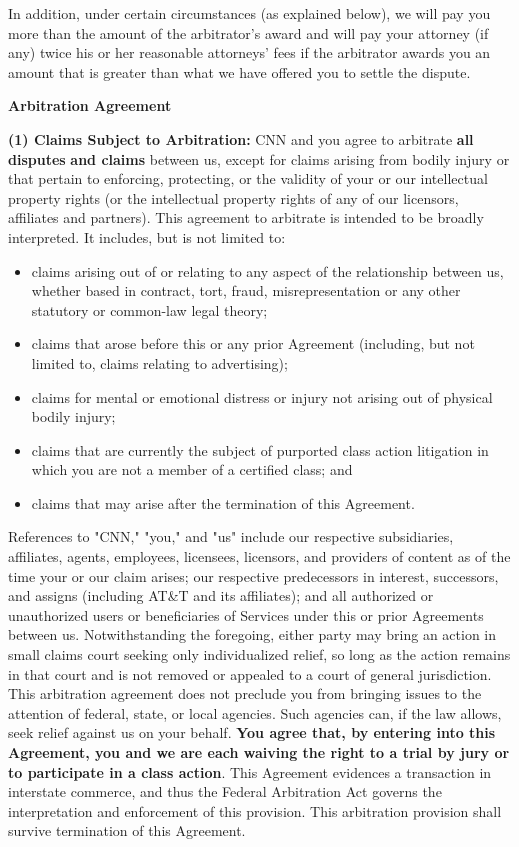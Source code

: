 In addition, under certain circumstances (as explained below), we will
pay you more than the amount of the arbitrator's award and will pay your
attorney (if any) twice his or her reasonable attorneys' fees if the
arbitrator awards you an amount that is greater than what we have
offered you to settle the dispute.

\textbf{Arbitration Agreement}

\textbf{(1) Claims Subject to Arbitration:} CNN and you agree to
arbitrate \textbf{all disputes} \textbf{and claims} between us, except
for claims arising from bodily injury or that pertain to enforcing,
protecting, or the validity of your or our intellectual property rights
(or the intellectual property rights of any of our licensors, affiliates
and partners). This agreement to arbitrate is intended to be broadly
interpreted. It includes, but is not limited to:

\begin{itemize}
\tightlist
\item
  claims arising out of or relating to any aspect of the relationship
  between us, whether based in contract, tort, fraud, misrepresentation
  or any other statutory or common-law legal theory;
\item
  claims that arose before this or any prior Agreement (including, but
  not limited to, claims relating to advertising);
\item
  claims for mental or emotional distress or injury not arising out of
  physical bodily injury;
\item
  claims that are currently the subject of purported class action
  litigation in which you are not a member of a certified class; and
\item
  claims that may arise after the termination of this Agreement.
\end{itemize}

References to "CNN," "you," and "us" include our respective
subsidiaries, affiliates, agents, employees, licensees, licensors, and
providers of content as of the time your or our claim arises; our
respective predecessors in interest, successors, and assigns (including
AT\&T and its affiliates); and all authorized or unauthorized users or
beneficiaries of Services under this or prior Agreements between us.
Notwithstanding the foregoing, either party may bring an action in small
claims court seeking only individualized relief, so long as the action
remains in that court and is not removed or appealed to a court of
general jurisdiction. This arbitration agreement does not preclude you
from bringing issues to the attention of federal, state, or local
agencies. Such agencies can, if the law allows, seek relief against us
on your behalf. \textbf{You agree that, by entering into this Agreement,
you and we are each waiving the right to a trial by jury or to
participate in a class action}. This Agreement evidences a transaction
in interstate commerce, and thus the Federal Arbitration Act governs the
interpretation and enforcement of this provision. This arbitration
provision shall survive termination of this Agreement.

